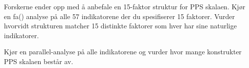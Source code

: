\documentclass[12pt,a4paper, norsk]{article}
\begin{document}
Forskerne ender opp med å anbefale en 15-faktor struktur for PPS skalaen. Kjør en \textsf{fa()} analyse på alle 57 indikatorene der du spesifiserer 15 faktorer. 
Vurder hvorvidt strukturen matcher 15 distinkte faktorer som hver har sine naturlige indikatorer. 


Kjør en parallel-analyse på alle indikatorene og vurder hvor mange konstrukter PPS skalaen består av.
\end{document}
